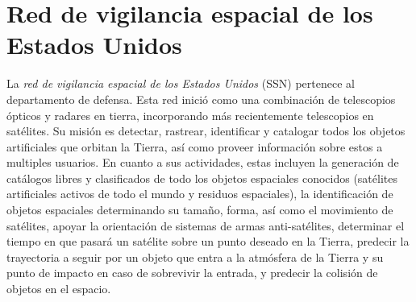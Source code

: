 \section*{Red de vigilancia espacial de los Estados Unidos}


La \emph{red de vigilancia espacial de los Estados Unidos} (SSN) pertenece al departamento de defensa.
Esta red inició como una combinación de telescopios ópticos y radares en tierra, incorporando más recientemente telescopios en satélites.
Su misión es detectar, rastrear, identificar y catalogar todos los objetos artificiales que orbitan la Tierra, así como proveer información sobre estos a multiples usuarios.\cite{SSN_chatters_2009}
En cuanto a sus actividades,
estas incluyen la generación de catálogos libres y clasificados de todo los objetos espaciales conocidos
(satélites artificiales activos de todo el mundo y residuos espaciales),
la identificación de objetos espaciales determinando su tamaño, forma, así como el movimiento de satélites,
apoyar la orientación de sistemas de armas anti-satélites,
determinar el tiempo en que pasará un satélite sobre un punto deseado en la Tierra,
predecir la trayectoria a seguir por un objeto que entra a la atmósfera de la Tierra y su punto de impacto en caso de sobrevivir la entrada,
y predecir la colisión de objetos en el espacio.\cite{detect_and_track}

